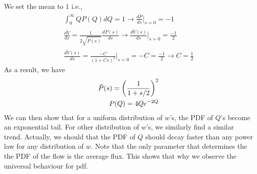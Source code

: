 %
We set the mean to $1$ i.e.,
%
\begin{align}
  \int_0^{\infty} Q P(Q) dQ = 1 \to \frac{d\tilde{P}}{ds}|_{s=0}  = -1\\
  \frac{d \tilde{V}}{ds}  = \frac{1}{2 \sqrt{\tilde{P}(s)}} \frac{d \tilde{P}(s)}{d s}   \to \frac{d\tilde{V}(s)}{ds}|_{s=0} =\frac{-1}{2} \\
  \frac{d\tilde{V}(s)}{ds} = \frac{-C}{(1+Cs)^{2}}|_{s=0} = -C = \frac{-1}{2}  \to C=\frac{1}{2} 
\end{align}
%
As a result, we have
%
\begin{align}
  \tilde{P}(s) = \left(\frac{1}{1+s/2} \right)^2 \\
  P(Q) = 4Q e^{-2Q}
\end{align}
%
We can then show that for a uniform distribution of $w$'s, the PDF of
$Q$'s become an exponential tail. For other distribution of $w$'s, we
similarly find a similar trend. Actually, we should that the PDF of
$Q$ should decay faster than any power law for any distribution of
$w$. Note that the only parameter that determines the the PDF of the
flow is the average flux. This shows that why we observe the universal
behaviour for pdf.

%
%
%
%
%

